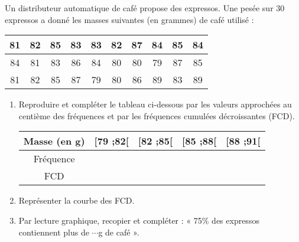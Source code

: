 
Un distributeur automatique de café propose des expressos. Une pesée sur 30 expressos a donné les masses
suivantes (en grammes) de café utilisé :

\begin{tabular}{|c|c|c|c|c|c|c|c|c|c|}
\hline 
81& 82& 85& 83 &83 &82 &87 &84& 85 &84\\ 
\hline 
84 &81 &83 &86 &84 &80& 80& 79 &87& 85\\ 
\hline 
81 &82 &85 &87 &79 &80& 86 &89& 83 &89\\ 
\hline 
\end{tabular} 

\begin{enumerate}
\item Reproduire et compléter le tableau ci-dessous par les valeurs approchées au centième des fréquences
et par les fréquences cumulées décroissantes (FCD).

\begin{tabular}{|c|c|c|c|c|}
\hline 
Masse (en g) &[79 ;82[& [82 ;85[ &[85 ;88[ &[88 ;91[\\
\hline 
Fréquence&&&&\\
\hline 
FCD&&&&\\
\hline 
\end{tabular} 

\item  Représenter la courbe des FCD.
\item  Par lecture graphique, recopier et compléter : « 75\% des expressos contiennent plus de $\cdots$g de
café ».
\end{enumerate}